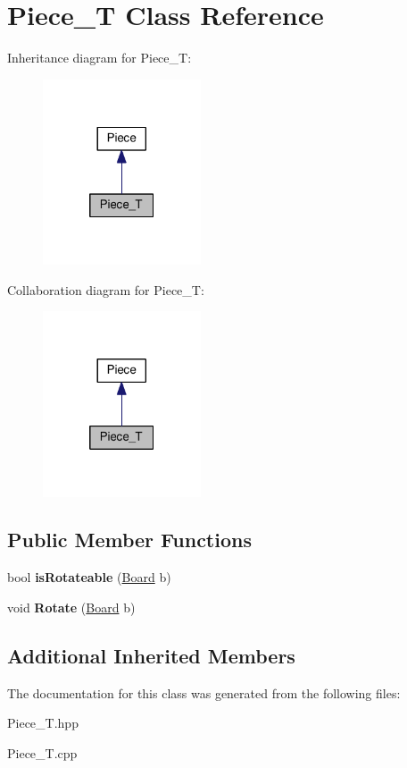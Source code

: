 \hypertarget{class_piece___t}{}\section{Piece\+\_\+T Class Reference}
\label{class_piece___t}


Inheritance diagram for Piece\+\_\+T\+:
\nopagebreak
\begin{figure}[H]
\begin{center}
\leavevmode
\includegraphics[width=133pt]{class_piece___t__inherit__graph}
\end{center}
\end{figure}


Collaboration diagram for Piece\+\_\+T\+:
\nopagebreak
\begin{figure}[H]
\begin{center}
\leavevmode
\includegraphics[width=133pt]{class_piece___t__coll__graph}
\end{center}
\end{figure}
\subsection*{Public Member Functions}
\begin{DoxyCompactItemize}
\item 
\mbox{\label{class_piece___t_a64088f0140b870d178169e36460cd4de}} 
bool {\bfseries is\+Rotateable} (\hyperlink{class_board}{Board} b)
\item 
\mbox{\label{class_piece___t_affedcbe550aebd2a9e8ec169d1fe0a9f}} 
void {\bfseries Rotate} (\hyperlink{class_board}{Board} b)
\end{DoxyCompactItemize}
\subsection*{Additional Inherited Members}


The documentation for this class was generated from the following files\+:\begin{DoxyCompactItemize}
\item 
Piece\+\_\+\+T.\+hpp\item 
Piece\+\_\+\+T.\+cpp\end{DoxyCompactItemize}
